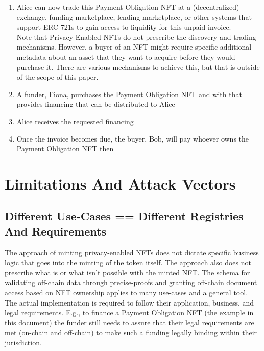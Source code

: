 \documentclass[a4paper, 10pt]{article}
\newcommand{\sbline}{\\[.5\normalbaselineskip]}%
\begin{document}
\begin{enumerate}
\begin{enumerate}
\begin{enumerate}
        \end{enumerate}
    \end{enumerate}
    \item Alice can now trade this Payment Obligation NFT at a (decentralized) exchange, funding marketplace, lending marketplace, or other systems that support ERC-721s to gain access to liquidity for this unpaid invoice.\sbline
Note that Privacy-Enabled NFTs do not prescribe the discovery and trading mechanisms. However, a buyer of an NFT might require specific additional metadata about an asset that they want to acquire before they would purchase it. There are various mechanisms to achieve this, but that is outside of the scope of this paper.
    \item A funder, Fiona, purchases the Payment Obligation NFT and with that provides financing that can be distributed to Alice
    \item Alice receives the requested financing
    \item Once the invoice becomes due, the buyer, Bob, will pay whoever owns the Payment Obligation NFT then
\end{enumerate}

\section{Limitations And Attack Vectors}
\subsection{Different Use-Cases == Different Registries And Requirements}
The approach of minting privacy-enabled NFTs does not dictate specific business logic that goes into the minting of the token itself. The approach also does not prescribe what is or what isn’t possible with the minted NFT. The schema for validating off-chain data through precise-proofs and granting off-chain document access based on NFT ownership applies to many use-cases and a general tool. The actual implementation is required to follow their application, business, and legal requirements.
E.g., to finance a Payment Obligation NFT (the example in this document) the funder still needs to assure that their legal requirements are met (on-chain and off-chain) to make such a funding legally binding within their jurisdiction. 
\end{document}
